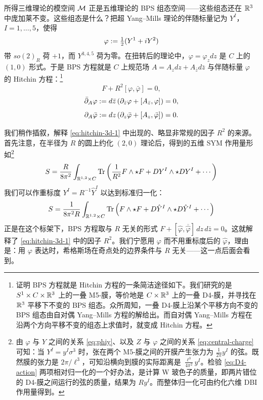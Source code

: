 所得三维理论的模空间 $\mathcal{M}$ 正是五维理论的 BPS 组态空间——这些组态还在 $\mathbb{R}^3$ 中庞加莱不变。这些组态是什么？把超 Yang–Mills 理论的伴随标量记为 $Y^I$，$I=1, \dots, 5$，使得
\begin{equation} \label{eq:phiy}
\varphi := \tfrac{1}{2}(Y^1 + i Y^2)
\end{equation}
带 $so(2)_R$ 荷 $+1$，而 $Y^{3,4,5}$ 荷为零。在扭转后的理论中，$\varphi = \varphi_z dz$ 是 $C$ 上的 $(1,0)$ 形式。于是 BPS 方程就是 $C$ 上规范场 $A = A_z dz + A_{\bar z} d\bar z$ 与伴随标量 $\varphi$ 的 Hitchin 方程：\footnote{证明 BPS 方程就是 Hitchin 方程的一条简洁途径如下。我们研究的是 $S^1 \times C \times \mathbb{R}^3$ 上的一叠 M5-膜，等价地是 $C \times \mathbb{R}^3$ 上的一叠 D4-膜，并寻找在 $\mathbb{R}^3$ 平移下不变的 BPS 组态。众所周知，一叠 D4-膜上沿某个平移方向不变的 BPS 组态由自对偶 Yang–Mills 方程的解给出。而自对偶 Yang–Mills 方程在沿两个方向平移不变的组态上求值时，就变成 Hitchin 方程\cite{MR89a:32021}。}
\begin{equation} \label{eq:hitchin-3d-1}
F + R^2 [\varphi , \bar\varphi] = 0,
\end{equation}
\begin{equation} \label{eq:hitchin-3d-2}
\bar{\partial}_A \varphi := d\bar z\left( \partial_{\bar z} \varphi  + [ A_{\bar z}  ,\varphi]\right) = 0,
\end{equation}
\begin{equation} \label{eq:hitchin-3d-3}
\partial_A \bar\varphi := dz\left( \partial_z \bar\varphi  + [ A_z,\bar\varphi] \right) = 0.
\end{equation}

我们稍作插叙，解释 \eqref{eq:hitchin-3d-1} 中出现的、略显非常规的因子 $R^2$ 的来源。首先注意，在半径为 $R$ 的圆上约化 $(2,0)$ 理论后，得到的五维 SYM 作用量形如\footnote{由 $\varphi$ 与 $Y$ 之间的关系 \eqref{eq:phiy}、以及 $Z$ 与 $\varphi$ 之间的关系 \eqref{eq:central-charge} 可知：当 $Y^I = y^I \sigma^3$ 时，张在两个 M5-膜之间的开膜产生张力为 $\frac{1}{2\pi} y^I$ 的弦。既然膜的张力是 $2\pi/\ell^3$，可知沿横向到膜的实际距离是 $\frac{\ell^3}{4\pi^2} y^I$。检验 \eqref{eq:D4-action} 两项相对归一化的一个好办法，是计算 W 玻色子的质量，即两片错位的 D4-膜之间运行的弦的质量，结果为 $Ry^I$。而整体归一化可由约化六维 DBI 作用量得到。}
\begin{equation}\label{eq:D4-action}
S =  \frac{ R}{8\pi^2} \int_{\mathbb{R}^{1,2}\times C} {\rm Tr} \left(
\frac{1}{R^2} F \wedge \star F + DY^I \wedge \star D Y^I + \cdots
\right)
\end{equation}
我们可以作重标度 $Y^I = R^{-1} \hat Y^I$ 以达到标准归一化：
\begin{equation}\label{eq:5deeAct}
S = \frac{1}{8\pi^2 R} \int_{\mathbb{R}^{1,2}\times C} {\rm Tr} \left( F
\wedge \star F + D\hat Y^I \wedge \star D \hat Y^I + \cdots \right)
\end{equation}
正是在这个标架下，BPS 方程取与 $R$ 无关的形式 $F + [\hat \varphi, \overline{\hat \varphi}]\,dz\,d \bar z=0$。这就解释了 \eqref{eq:hitchin-3d-1} 中的因子 $R^2$。我们宁愿用 $\varphi$ 而不用重标度后的 $\hat \varphi$，理由是：用 $\varphi$ 表达时，希格斯场在奇点处的边界条件与 $R$ 无关——这一点后面会看到。

